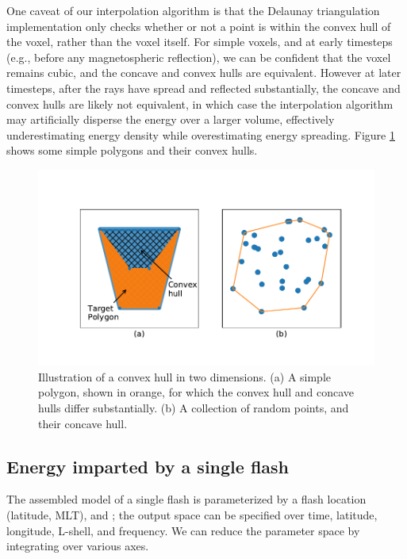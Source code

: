 One caveat of our interpolation algorithm is that the Delaunay triangulation implementation only checks whether or not a point is within the convex hull of the voxel, rather than the voxel itself. For simple voxels, and at early timesteps (e.g., before any magnetospheric reflection), we can be confident that the voxel remains cubic, and the concave and convex hulls are equivalent. However at later timesteps, after the rays have spread and reflected substantially, the concave and convex hulls are likely not equivalent, in which case the interpolation algorithm may artificially disperse the energy over a larger volume, effectively underestimating energy density while overestimating energy spreading. Figure \ref{fig:convex_hulls} shows some simple polygons and their convex hulls.
\begin{figure}[h]
\begin{center}
\includegraphics{figures/convex_hulls.pdf}
\caption[Qualitative illustration of convex and concave hulls]{Illustration of a convex hull in two dimensions. (a) A simple polygon, shown in orange, for which the convex hull and concave hulls differ substantially. (b) A collection of random points, and their concave hull.}
\label{fig:convex_hulls}
\end{center}
\end{figure}


\subsection{Energy imparted by a single flash}
The assembled model of a single flash is parameterized by a flash location (latitude, MLT), and \kp{}; the output space can be specified over time, latitude, longitude, L-shell, and frequency. We can reduce the parameter space by integrating over various axes.

